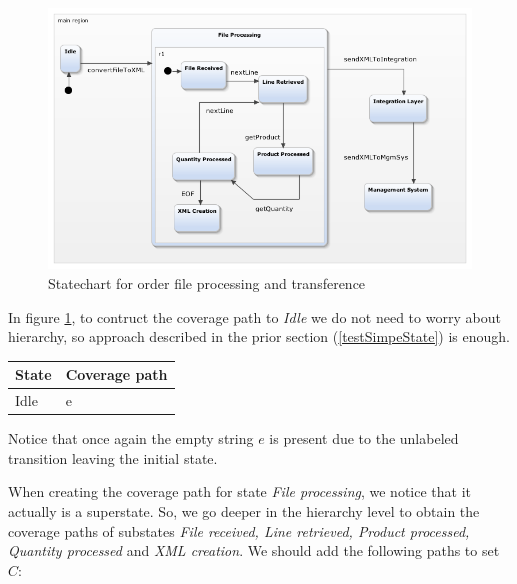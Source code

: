 \begin{figure}[htb]
\centering
\includegraphics[width=15cm]{figuras/webEDI}
\caption{\label{fig:webEDI} Statechart for order file processing and transference}
\end{figure}

In figure \ref{fig:webEDI}, to contruct the coverage path to \textit{Idle} we do not need to worry about hierarchy, so approach described in the prior section (\ref{testSimpeState}) is enough.

\begin{center}
\begin{tabular}{| l | l|}

\hline

State & Coverage path \\ \hline

Idle & e \\

\hline
\end{tabular}
\end{center}

Notice that once again the empty string $e$ is present due to the unlabeled transition leaving the initial state.

When creating the coverage path for state \textit{File processing}, we notice that it actually is a superstate. So, we go deeper in the hierarchy level to obtain the coverage paths of substates \textit{File received, Line retrieved, Product processed, Quantity processed} and \textit{XML creation}. We should add the following paths to set $C$:

